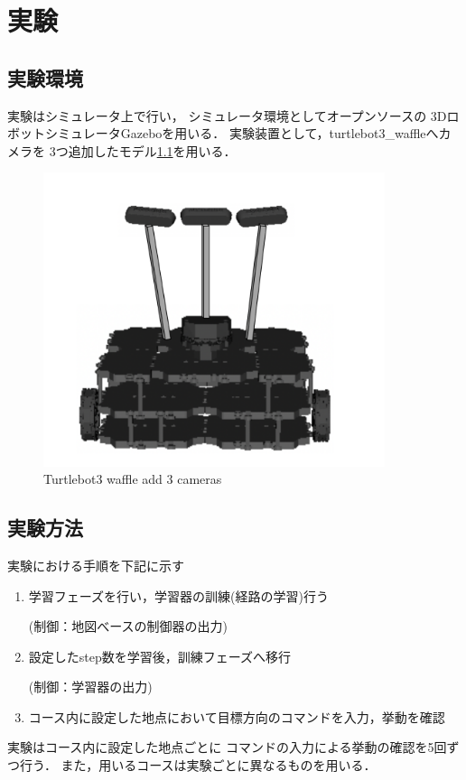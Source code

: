 \chapter{実験}
\section{実験環境}
実験はシミュレータ上で行い，
シミュレータ環境としてオープンソースの
3DロボットシミュレータGazebo\cite{gazebo:online}を用いる．
実験装置として，turtlebot3\_waffle\cite{turtlebot3:online}へカメラを
3つ追加したモデル\ref{fig::turtlebot3}を用いる．

\begin{figure}[H]
    \centering
    \includegraphics[width = 10cm]{./figs/3_camera.png}
    \caption{Turtlebot3 waffle add 3 cameras}
    \label{fig::turtlebot3}
\end{figure}

\section{実験方法}

実験における手順を下記に示す
\begin{enumerate}
  \item 学習フェーズを行い，学習器の訓練(経路の学習)行う　
        
  (制御：地図べースの制御器の出力)
  \item 設定したstep数を学習後，訓練フェーズへ移行　
  
  (制御：学習器の出力)
  \item コース内に設定した地点において目標方向のコマンドを入力，挙動を確認
\end{enumerate}
実験はコース内に設定した地点ごとに
コマンドの入力による挙動の確認を5回ずつ行う． 
また，用いるコースは実験ごとに異なるものを用いる．

